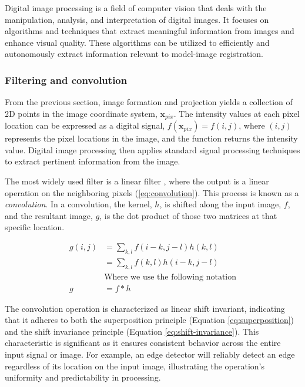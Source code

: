 Digital image processing is a field of computer vision that deals with the manipulation, analysis, and interpretation of digital images.
It focuses on algorithms and techniques that extract meaningful information from images and enhance visual quality.
These algorithms can be utilized to efficiently and autonomously extract information relevant to model-image registration.

\subsubsection{Filtering and convolution}
\label{sec:filtering-convolution}
From the previous section, image formation and projection yields a collection of 2D points in the image coordinate system, $\mathbf{x}_{pix}$.
The intensity values at each pixel location can be expressed as a digital signal, $f(\mathbf{x}_{pix}) = f(i,j)$, where $(i,j)$ represents the pixel locations in the image, and the function returns the intensity value.
Digital image processing then applies standard signal processing techniques to extract pertinent information from the image.

The most widely used filter is a linear filter \cite{szeliskiComputerVisionAlgorithms2022}, where the output is a linear operation on the neighboring pixels (\cref{eq:convolution}).
This process is known as a \emph{convolution}.
In a convolution, the kernel, $h$, is shifted along the input image, $f$, and the resultant image, $g$, is the dot product of those two matrices at that specific location.

\begin{equation}
    \begin{aligned}
        g(i,j) &= \sum_{k,l}f(i-k,j-l)h(k,l) \\
        &= \sum_{k,l}f(k,l)h(i-k,j-l) \\
        &\text{Where we use the following notation}\\
        g&= f * h
    \end{aligned}
    \label{eq:convolution}
\end{equation}

The convolution operation is characterized as linear shift invariant, indicating that it adheres to both the superposition principle (Equation \ref{eq:superposition}) and the shift invariance principle (Equation \ref{eq:shift-invariance}).
This characteristic is significant as it ensures consistent behavior across the entire input signal or image.
For example, an edge detector will reliably detect an edge regardless of its location on the input image, illustrating the operation's uniformity and predictability in processing.

